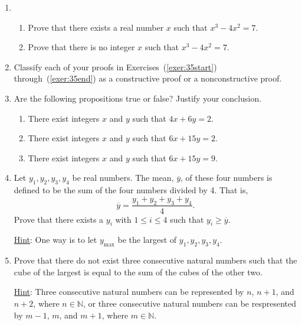 \begin{enumerate}
\item \begin{enumerate} \label{exer:sec35-solution}
\item Prove that there exists a real number  $x$  such that  $x^3  - 4x^2  = 7$. \label{exer:35end}
\item Prove that there is no integer $x$ such that  $x^3  - 4x^2  = 7$.
\end{enumerate}

\item Classify each of your proofs in Exercises~(\ref{exer:35start}) through~(\ref{exer:35end}) as a constructive proof or a nonconstructive proof.

\item Are the following propositions true or false?  Justify your conclusion. 
\label{exer:sec35-9}

  \begin{enumerate}
    \item There exist integers  $x$  and  $y$ such that  $4x + 6y = 2$.
    \item There exist integers  $x$  and  $y$ such that  $6x + 15y = 2$.
    \item There exist integers  $x$  and  $y$ such that  $6x + 15y = 9$.
  \end{enumerate}

\item Let  $y_1 , y_2 , y_3 , y_4 $ be  real numbers.  The mean, $\overline y $,  of these four numbers is defined to be the sum of the four numbers divided by 4.  That is,
\[
\overline y  = \frac{{y_1  + y_2  + y_3  + y_4 }}{4}.
\]
Prove that there exists a  $y_i $ with  $1 \leqslant i \leqslant 4$ such that  $y_i  \geqslant \overline y $.

\underline{Hint}:  One way is to let  $y_{\text{max}}$ be the largest of  
$y_1 , y_2 , y_3 , y_4 $.

\item Prove that there do not exist three consecutive natural numbers such that the cube of the largest is equal to the sum of the cubes of the other two. \label{exer:sec35-10}

\underline{Hint}: Three consecutive natural numbers can be represented by $n$, $n + 1$, and 
$n + 2$, where $n \in \mathbb{N}$, or three consecutive natural numbers can be respresented by 
$m - 1$, $m$, and $m + 1$, where $m \in \mathbb{N}$.

\end{enumerate}
\hbreak
\endinput
